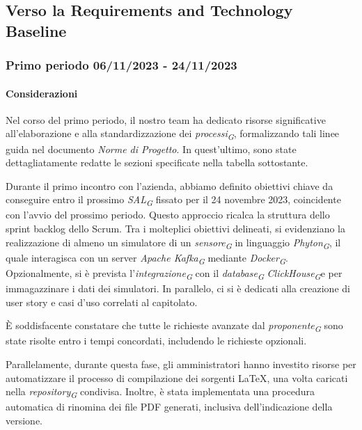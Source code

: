 \subsection{Verso la Requirements and Technology Baseline}
\subsubsection{Primo periodo  06/11/2023 - 24/11/2023}
\paragraph{Considerazioni}
    Nel corso del primo periodo, il nostro team ha dedicato risorse significative all'elaborazione e alla standardizzazione dei \textit{processi}\textsubscript{\textit{G}}, formalizzando tali linee guida nel documento \textit{Norme di Progetto}. In quest'ultimo, sono state dettagliatamente redatte le sezioni specificate nella tabella sottostante.

    \vspace{0.2cm}

    Durante il primo incontro con l'azienda, abbiamo definito obiettivi chiave da conseguire entro il prossimo \textit{SAL}\textsubscript{\textit{G}} fissato per il 24 novembre 2023, coincidente con l'avvio del prossimo periodo. Questo approccio ricalca la struttura dello sprint backlog dello Scrum.
    Tra i molteplici obiettivi delineati, si evidenziano la realizzazione di almeno un simulatore di un \textit{sensore}\textsubscript{\textit{G}} in linguaggio \textit{Phyton}\textsubscript{\textit{G}}, il quale interagisca con un server \textit{Apache Kafka}\textsubscript{\textit{G}} mediante \textit{Docker}\textsubscript{\textit{G}}. Opzionalmente, si è prevista l'\textit{integrazione}\textsubscript{\textit{G}} con il \textit{database}\textsubscript{\textit{G}} \textit{ClickHouse}\textsubscript{\textit{G}}e per immagazzinare i dati dei simulatori. In parallelo, ci si è dedicati alla creazione di user story e casi d'uso correlati al capitolato.

    \vspace{0.2cm}

    È soddisfacente constatare che tutte le richieste avanzate dal \textit{proponente}\textsubscript{\textit{G}} sono state risolte entro i tempi concordati, includendo le richieste opzionali.

    Parallelamente, durante questa fase, gli amministratori hanno investito risorse per automatizzare il processo di compilazione dei sorgenti \LaTeX, una volta caricati nella \textit{repository}\textsubscript{\textit{G}} condivisa. Inoltre, è stata implementata una procedura automatica di rinomina dei file PDF generati, inclusiva dell'indicazione della versione.

